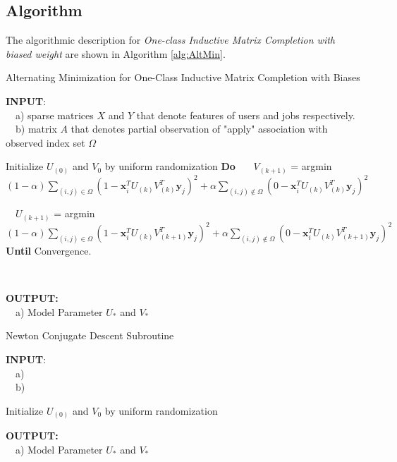 \documentclass{article} %
\begin{document}
\subsection{Algorithm}
\newcommand{\xii}{\boldsymbol{x}_i}
\newcommand{\yj}{\boldsymbol{y}_j}
The algorithmic description for {\it One-class Inductive Matrix Completion
    with biased weight} are shown in Algorithm \ref{alg:AltMin}.  
\begin{algorithm}
    \caption{Alternating Minimization for One-Class Inductive Matrix Completion with Biases}
    \label{alg:AltMin}
    \begin{algorithmic}[1]

\State \textbf{INPUT}: \\ \ \ a) sparse matrices $X$ and $Y$ that denote features of users
and jobs respectively. \\ \ \ b) matrix $A$ that denotes partial observation
of "apply" association with observed index set $\Omega$ \State \

\State Initialize $U_{(0)}$ and $V_{0}$ by uniform randomization
\State \textbf{Do}  
\State \ \ \
$V_{(k+1)}$ = argmin $(1-\alpha) \sum_{(i,j) \in \Omega} 
    (1- \xii^T U_{(k)} V_{(k)}^T \yj)^2 
    + \alpha \sum_{(i,j) \not \in \Omega} (0 - \xii^T U_{(k)} V_{(k)}^T \yj)^2$

\State \  \
$U_{(k+1)}$ = argmin $(1-\alpha) \sum_{(i,j) \in \Omega}
    (1-\xii^T U_{(k)} V_{(k+1)}^T \yj)^2 +
    \alpha \sum_{(i,j) \not \in \Omega}
    (0-\xii^T U_{(k)} V_{(k+1)}^T \yj)^2$
\State \textbf{Until} Convergence. 

\State \

\State \textbf{OUTPUT: } \\ 
\ \ a) Model Parameter $ U_{*}$ and $V_{*}$ 
\end{algorithmic}
\end{algorithm}

\begin{algorithm}
    \caption{Newton Conjugate Descent Subroutine}
    \label{alg:newton}
    \begin{algorithmic}[1]

\State \textbf{INPUT}: \\ \ \ a) 
\\ \ \ b) 
\State \

\State Initialize $U_{(0)}$ and $V_{0}$ by uniform randomization
\State \

\State \textbf{OUTPUT: } \\ 
\ \ a) Model Parameter $ U_{*}$ and $V_{*}$ 
\end{algorithmic}
\end{algorithm}
\end{document}
